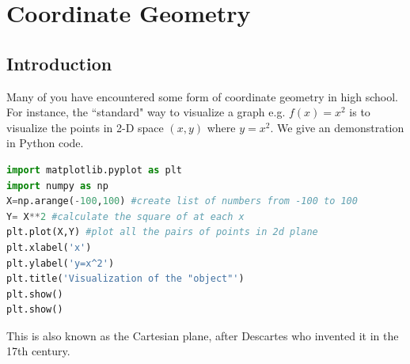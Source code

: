 \chapter{Coordinate Geometry}

\section{Introduction}
Many of you have encountered some form of coordinate geometry in high school. For instance, the ``standard" way to visualize a graph e.g. $f(x)=x^2$ is to visualize the points in 2-D space $(x,y)$ where $y=x^2$. We give an demonstration in Python code.

\begin{lstlisting}[language=Python]
import matplotlib.pyplot as plt
import numpy as np
X=np.arange(-100,100) #create list of numbers from -100 to 100
Y= X**2 #calculate the square of at each x
plt.plot(X,Y) #plot all the pairs of points in 2d plane
plt.xlabel('x')
plt.ylabel('y=x^2')
plt.title('Visualization of the "object"')
plt.show()
plt.show()
\end{lstlisting}


This is also known as the Cartesian plane, after Descartes who invented it in the 17th century.\\
